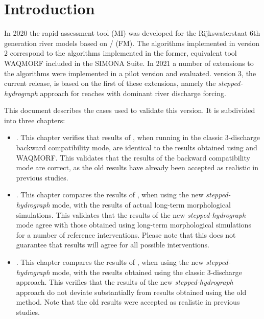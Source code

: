 \chapter{Introduction}
In 2020 the rapid assessment tool \dfastmi (MI) was developed for the Rijkswaterstaat 6th generation river models based on \dhydrosuite / \dflowfmfull (FM).
The algorithms implemented in \dfmi version 2 correspond to the algorithms implemented in the former, equivalent tool WAQMORF included in the SIMONA Suite.
In 2021 a number of extensions to the \dfastmi algorithms were implemented in a pilot version and evaluated.
\dfmi version 3, the current release, is based on the first of these extensions, namely the \emph{stepped-hydrograph} approach for reaches with dominant river discharge forcing.

This document describes the cases used to validate this version.
It is subdivided into three chapters:

\begin{itemize}
\item {}. This chapter verifies that results of , when running in the classic 3-discharge backward compatibility mode, are identical to the results obtained using  and WAQMORF.
This validates that the results of the backward compatibility mode are correct, as the old results have already been accepted as realistic in previous studies.
\item {}. This chapter compares the results of , when using the new \emph{stepped-hydrograph} mode, with the results of actual long-term morphological simulations.
This validates that the results of the new \emph{stepped-hydrograph} mode agree with those obtained using long-term morphological simulations for a number of reference interventions.
Please note that this does not guarantee that results will agree for all possible interventions. 
\item {}. This chapter compares the results of , when using the new \emph{stepped-hydrograph} mode, with the results obtained using the classic 3-discharge approach.
This verifies that the results of the new \emph{stepped-hydrograph} approach do not deviate substantially from results obtained using the old method.
Note that the old results were accepted as realistic in previous studies.
\end{itemize}
